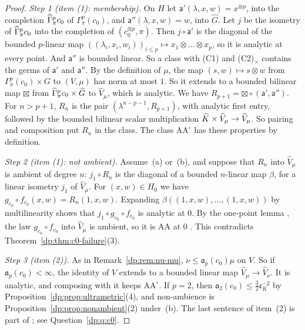 \begin{proof}
\emph{Step 1 (item (1): membership).} On $H$ let $\mathsf a'(\lambda,x,w)=x^{\otimes p}$, into the completion $\widehat\Gamma^p_\pi c_0$ of $\Gamma^p_\pi(c_0)$, and $\mathsf a''(\lambda,x,w)=w$, into $\widehat G$. Let $j$ be the isometry of $\widehat\Gamma^p_\pi c_0$ into the completion of $(c_0^{\otimes p},\pi)$. Then $j\circ\mathsf a'$ is the diagonal of the bounded $p$\nobreakdash-linear map $((\lambda_i,x_i,w_i))_{i\le p}\mapsto x_1\otimes\dots\otimes x_p$, so it is analytic at every point. And $\mathsf a''$ is bounded linear. So a class with (C1) and (C2)$_\times$ contains the germs of $\mathsf a'$ and $\mathsf a''$. By the definition of $\mu$, the map $(s,w)\mapsto s\otimes w$ from $\Gamma^p_\pi(c_0)\times G$ to $(V,\mu)$ has norm at most $1$. So it extends to a bounded bilinear map $\boxtimes$ from $\widehat\Gamma^p_\pi c_0\times\widehat G$ to $\widehat V_\mu$, which is analytic. We have $R_{p+1}=\boxtimes\circ(\mathsf a',\mathsf a'')$. For $n>p+1$, $R_n$ is the pair $(\lambda^{n-p-1},R_{p+1})$, with analytic first entry, followed by the bounded bilinear scalar multiplication $\widehat K\times\widehat V_\mu\to\widehat V_\mu$. So pairing and composition put $R_n$ in the class. The class $\mathrm{AA}^\circ$ has these properties by definition.

\emph{Step 2 (item (1): not ambient).} Assume~(a) or~(b), and suppose that $R_n$ into $\widehat V_\mu$ is ambient of degree $n$: $j_1\circ R_n$ is the diagonal of a bounded $n$\nobreakdash-linear map $\beta$, for a linear isometry $j_1$ of $\widehat V_\mu$. For $(x,w)\in H_0$ we have $g_{c_0}\circ f_{c_0}(x,w)=R_n(1,x,w)$. Expanding $\beta((1,x,w),\dots,(1,x,w))$ by multilinearity shows that $j_1\circ g_{c_0}\circ f_{c_0}$ is analytic at $0$. By the one-point lemma \cite[Proposition~14.9(2)]{I}, the law $g_{c_0}\circ f_{c_0}$ into $\widehat V_\mu$ is ambient, so it is AA at $0$ \cite[Proposition~14.9(1)]{I}. This contradicts Theorem~\ref{dp:thm:c0-failure}(3).

\emph{Step 3 (item (2)).} As in Remark~\ref{dp:rem:nu-mu}, $\nu\le\mathfrak a_p(c_0)\mu$ on $V$. So if $\mathfrak a_p(c_0)<\infty$, the identity of $V$ extends to a bounded linear map $\widehat V_\mu\to\widehat V_\nu$. It is analytic, and composing with it keeps $\mathrm{AA}^\circ$. If $p=2$, then $\mathfrak a_2(c_0)\le\frac32\mathfrak c_K^{-2}$ by Proposition~\ref{dp:prop:ultrametric}(4), and non-ambience is Proposition~\ref{dp:prop:nonambient}(2) under~(b). The last sentence of item~(2) is part of \cite[Question~14.42(4)]{I}; see Question~\ref{dp:q:c0}.


\end{proof}
